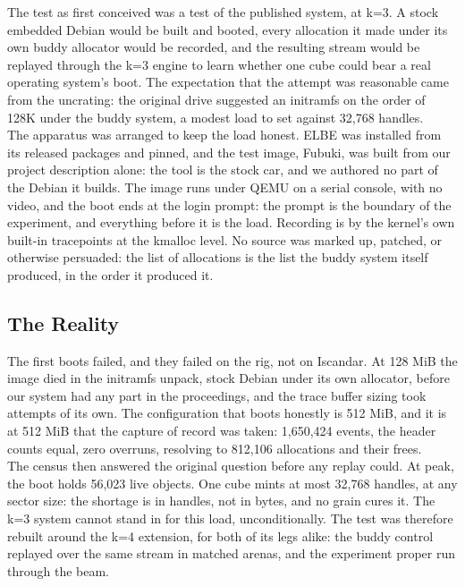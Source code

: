 \documentclass{article}
\begin{document}
The test as first conceived was a test of the published system, at k=3. A stock embedded Debian would be built and booted, every allocation it made under its own buddy allocator would be recorded, and the resulting stream would be replayed through the k=3 engine to learn whether one cube could bear a real operating system's boot. The expectation that the attempt was reasonable came from the uncrating: the original drive suggested an initramfs on the order of 128K under the buddy system, a modest load to set against 32,768 handles.\\

The apparatus was arranged to keep the load honest. ELBE was installed from its released packages and pinned, and the test image, Fubuki, was built from our project description alone: the tool is the stock car, and we authored no part of the Debian it builds. The image runs under QEMU on a serial console, with no video, and the boot ends at the login prompt: the prompt is the boundary of the experiment, and everything before it is the load. Recording is by the kernel's own built-in tracepoints at the kmalloc level. No source was marked up, patched, or otherwise persuaded: the list of allocations is the list the buddy system itself produced, in the order it produced it.

\subsection{The Reality}

The first boots failed, and they failed on the rig, not on Iscandar. At 128 MiB the image died in the initramfs unpack, stock Debian under its own allocator, before our system had any part in the proceedings, and the trace buffer sizing took attempts of its own. The configuration that boots honestly is 512 MiB, and it is at 512 MiB that the capture of record was taken: 1,650,424 events, the header counts equal, zero overruns, resolving to 812,106 allocations and their frees.\\

The census then answered the original question before any replay could. At peak, the boot holds 56,023 live objects. One cube mints at most 32,768 handles, at any sector size: the shortage is in handles, not in bytes, and no grain cures it. The k=3 system cannot stand in for this load, unconditionally. The test was therefore rebuilt around the k=4 extension, for both of its legs alike: the buddy control replayed over the same stream in matched arenas, and the experiment proper run through the beam.\\
\end{document}
